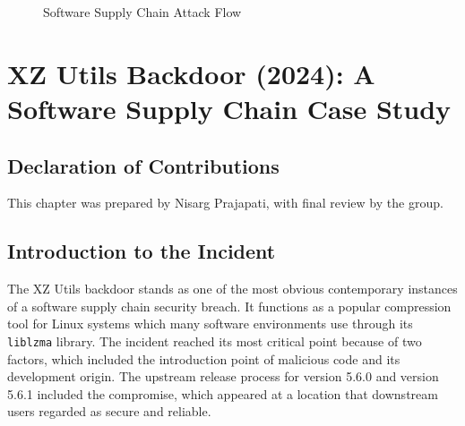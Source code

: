 \begin{figure}[htbp]
\begin{minipage}[t]{0.55\textwidth}
        \caption{Software Supply Chain Attack Flow}
        \label{fig:supply_chain_flow}
    \end{minipage}
\end{figure}

\chapter{XZ Utils Backdoor (2024): A Software Supply Chain Case Study}
\label{ch:casestudy}

\section*{Declaration of Contributions}
This chapter was prepared by Nisarg Prajapati, with final review by the group.

\section{Introduction to the Incident}

The XZ Utils backdoor stands as one of the most obvious contemporary instances of a software supply chain security breach. It functions as a popular compression tool for Linux systems which many software environments use through its \texttt{liblzma} library. The incident reached its most critical point because of two factors, which included the introduction point of malicious code and its development origin. The upstream release process for version 5.6.0 and version 5.6.1 included the compromise, which appeared at a location that downstream users regarded as secure and reliable. 


